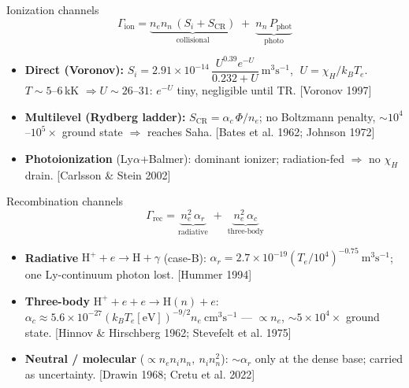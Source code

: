 \documentclass[aspectratio=169]{beamer}
\newcommand{\cit}[1]{{\scriptsize\color{gray}[#1]}}
\begin{document}
\begin{frame}{Ionization channels}
  \[
    \Gamma_\mathrm{ion}
      = \underbrace{n_e n_n\,(S_i+S_\mathrm{CR})}_{\text{collisional}}
      \;+\; \underbrace{n_n\,P_\mathrm{phot}}_{\text{photo}}
  \]
  \begin{itemize}\setlength\itemsep{4pt}
    \item \textbf{Direct (Voronov):}
      $S_i=2.91\times10^{-14}\,\dfrac{U^{0.39}e^{-U}}{0.232+U}\ \mathrm{m^3 s^{-1}}$,
      $\;U=\chi_H/k_BT_e$.\\
      $T\!\sim\!5$--$6$\,kK $\Rightarrow U\!\sim\!26$--$31$: $e^{-U}$ tiny, \alert{negligible until TR}.
      \cit{Voronov 1997}
    \item \textbf{Multilevel (Rydberg ladder):} $S_\mathrm{CR}=\alpha_c\,\Phi/n_e$;
      no Boltzmann penalty, $\sim10^{4}$--$10^{5}\times$ ground state $\Rightarrow$ reaches Saha.
      \cit{Bates et al. 1962; Johnson 1972}
    \item \textbf{Photoionization} (Ly$\alpha$+Balmer): \alert{dominant ionizer};
      radiation-fed $\Rightarrow$ no $\chi_H$ drain. \cit{Carlsson \& Stein 2002}
  \end{itemize}
\end{frame}

\begin{frame}{Recombination channels}
  \[
    \Gamma_\mathrm{rec}
      = \underbrace{n_e^2\,\alpha_r}_{\text{radiative}}
      \;+\; \underbrace{n_e^2\,\alpha_c}_{\text{three-body}}
  \]
  \begin{itemize}\setlength\itemsep{4pt}
    \item \textbf{Radiative} $\mathrm{H^+}\!+e\to\mathrm H+\gamma$ (case-B):
      $\alpha_r=2.7\times10^{-19}(T_e/10^4)^{-0.75}\ \mathrm{m^3 s^{-1}}$; one Ly-continuum photon lost.
      \cit{Hummer 1994}
    \item \textbf{Three-body} $\mathrm{H^+}\!+e+e\to\mathrm H(n)+e$:
      $\alpha_c\approx 5.6\times10^{-27}(k_BT_e[\mathrm{eV}])^{-9/2}n_e\ \mathrm{cm^3 s^{-1}}$ —
      \alert{$\propto n_e$}, $\sim5\times10^4\times$ ground state.
      \cit{Hinnov \& Hirschberg 1962; Stevefelt et al. 1975}
    \item \textbf{Neutral / molecular} ($\propto n_e n_i n_n,\ n_i n_n^2$):
      $\sim\alpha_r$ only at the dense base; carried as uncertainty.
      \cit{Drawin 1968; Cretu et al. 2022}
  \end{itemize}
\end{frame}
\end{document}
